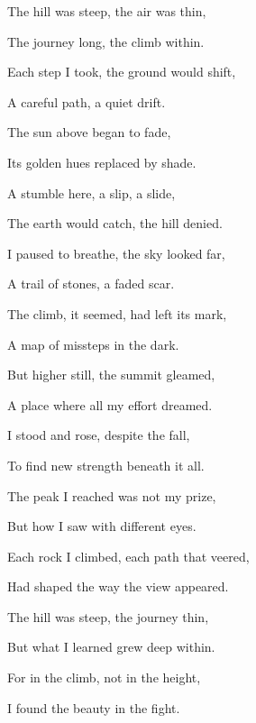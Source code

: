 \documentclass[12pt]{article}
\begin{document}
\begin{tcolorbox}[colframe=black!60, colback=white, 
coltitle=black, colbacktitle=black!15, fonttitle=\bfseries\Large, 
title=Text: \textit{The Lesson in Fall}, halign title=center, left=10pt, right=10pt, top=10pt, bottom=15pt]

The hill was steep, the air was thin,

The journey long, the climb within.

Each step I took, the ground would shift,

A careful path, a quiet drift.

The sun above began to fade,

Its golden hues replaced by shade.

A stumble here, a slip, a slide,

The earth would catch, the hill denied.

I paused to breathe, the sky looked far,

A trail of stones, a faded scar.

The climb, it seemed, had left its mark,

A map of missteps in the dark.

But higher still, the summit gleamed,

A place where all my effort dreamed.

I stood and rose, despite the fall,

To find new strength beneath it all.

The peak I reached was not my prize,

But how I saw with different eyes.

Each rock I climbed, each path that veered,

Had shaped the way the view appeared.

The hill was steep, the journey thin,

But what I learned grew deep within.

For in the climb, not in the height,

I found the beauty in the fight.

 

 

 

\end{tcolorbox}
\end{document}
